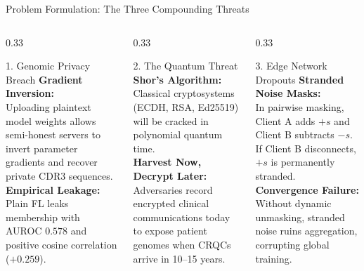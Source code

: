 \documentclass[aspectratio=169,10pt]{beamer}
\begin{document}
\begin{frame}{Problem Formulation: The Three Compounding Threats}
  \begin{columns}[T]
    \begin{column}{0.33\textwidth}
      \begin{alertblock}{1. Genomic Privacy Breach}
        \footnotesize
        \textbf{Gradient Inversion:}\\
        Uploading plaintext model weights allows semi-honest servers to invert parameter gradients and recover private CDR3 sequences.\\
        \vspace{0.1cm}
        \textbf{Empirical Leakage:}\\
        Plain FL leaks membership with AUROC $0.578$ and positive cosine correlation ($+0.259$).
      \end{alertblock}
    \end{column}
    \begin{column}{0.33\textwidth}
      \begin{alertblock}{2. The Quantum Threat}
        \footnotesize
        \textbf{Shor's Algorithm:}\\
        Classical cryptosystems (ECDH, RSA, Ed25519) will be cracked in polynomial quantum time.\\
        \vspace{0.1cm}
        \textbf{Harvest Now, Decrypt Later:}\\
        Adversaries record encrypted clinical communications today to expose patient genomes when CRQCs arrive in 10--15 years.
      \end{alertblock}
    \end{column}
    \begin{column}{0.33\textwidth}
      \begin{alertblock}{3. Edge Network Dropouts}
        \footnotesize
        \textbf{Stranded Noise Masks:}\\
        In pairwise masking, Client A adds $+s$ and Client B subtracts $-s$. If Client B disconnects, $+s$ is permanently stranded.\\
        \vspace{0.1cm}
        \textbf{Convergence Failure:}\\
        Without dynamic unmasking, stranded noise ruins aggregation, corrupting global training.
      \end{alertblock}
    \end{column}
  \end{columns}
\end{frame}
\end{document}
